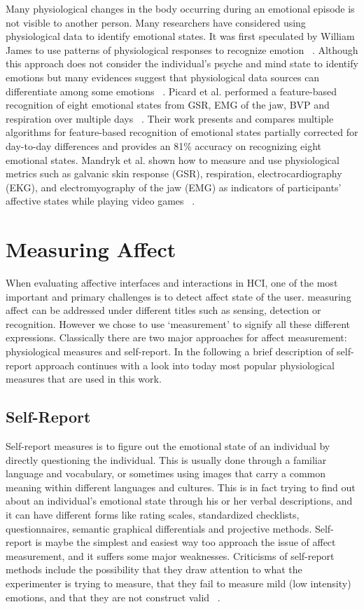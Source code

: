 \documentclass{uofsthesis-cs}
\begin{document}
Many physiological changes in the body occurring during an emotional episode is not visible to another person. Many researchers have considered using physiological data to identify emotional states. It was first speculated by William James to use patterns of physiological responses to recognize emotion ~\cite{cacioppo2000psychophysiology}. Although this approach does not consider the individual's psyche and mind state to identify emotions but many evidences suggest that physiological data sources can differentiate among some emotions ~\cite{ekman1983autonomic}. Picard et al. performed a feature-based recognition of eight emotional states from GSR, EMG of the jaw, BVP and respiration over multiple days ~\cite{picard2001toward}. Their work presents and compares multiple algorithms for feature-based recognition of emotional states partially corrected for day-to-day differences and provides an 81\% accuracy on recognizing eight emotional states. Mandryk et al. shown how to measure and use physiological metrics such as galvanic skin response (GSR), respiration, electrocardiography (EKG), and electromyography of the jaw (EMG) as indicators of participants' affective states while playing video games ~\cite{mandryk2007fuzzy}.

\section{Measuring Affect}
When evaluating affective interfaces and interactions in HCI, one of the most important and primary challenges is to detect affect state of the user. measuring affect can be addressed under different titles such as sensing, detection or recognition. However we chose to use `measurement' to signify all these different expressions. Classically there are two major approaches for affect measurement: physiological measures and self-report. In the following a brief description of self-report approach continues with a look into today most popular physiological measures that are used in this work.

\subsection{Self-Report}
Self-report measures is to figure out the emotional state of an individual by directly questioning the individual. This is usually done through a familiar language and vocabulary, or sometimes using images that carry a common meaning within different languages and cultures. This is in fact trying to find out about an individual's emotional state through his or her verbal descriptions, and it can have different forms like rating scales, standardized checklists, questionnaires, semantic graphical differentials and projective methods. Self-report is maybe the simplest and easiest way too approach the issue of affect measurement, and it suffers some major weaknesses. Criticisms of self-report methods include the possibility that they draw attention to what the experimenter is trying to measure, that they fail to measure mild (low intensity) emotions, and that they are not construct valid ~\cite{isen2007some}.
\end{document}
